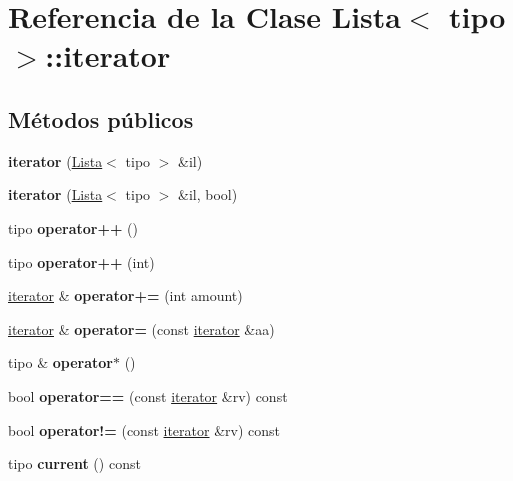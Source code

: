 \hypertarget{classLista_1_1iterator}{}\section{Referencia de la Clase Lista$<$ tipo $>$\+:\+:iterator}
\label{classLista_1_1iterator}
\subsection*{Métodos públicos}
\begin{DoxyCompactItemize}
\item 
\mbox{\label{classLista_1_1iterator_a1535d6055cf70a60518be63c0f62cc1d}} 
{\bfseries iterator} (\hyperlink{classLista}{Lista}$<$ tipo $>$ \&il)
\item 
\mbox{\label{classLista_1_1iterator_ad96ff61e26fb131406d0b320b36e9516}} 
{\bfseries iterator} (\hyperlink{classLista}{Lista}$<$ tipo $>$ \&il, bool)
\item 
\mbox{\label{classLista_1_1iterator_af8c7d385ce8bc7c62b8bc806db714ae9}} 
tipo {\bfseries operator++} ()
\item 
\mbox{\label{classLista_1_1iterator_ac9059ed8e1f396ec967ae97b571d11fe}} 
tipo {\bfseries operator++} (int)
\item 
\mbox{\label{classLista_1_1iterator_a99315852e99d13cfac11f570917ac092}} 
\hyperlink{classLista_1_1iterator}{iterator} \& {\bfseries operator+=} (int amount)
\item 
\mbox{\label{classLista_1_1iterator_a602f51e54500d6027158a48a8495826a}} 
\hyperlink{classLista_1_1iterator}{iterator} \& {\bfseries operator=} (const \hyperlink{classLista_1_1iterator}{iterator} \&aa)
\item 
\mbox{\label{classLista_1_1iterator_a2a48c3991820aef39d777df2c8e19664}} 
tipo \& {\bfseries operator$\ast$} ()
\item 
\mbox{\label{classLista_1_1iterator_abb50011145596234ea6ac6d1bd5fe920}} 
bool {\bfseries operator==} (const \hyperlink{classLista_1_1iterator}{iterator} \&rv) const
\item 
\mbox{\label{classLista_1_1iterator_a25cd74ab23dd46dd3e9f0769c0264eb9}} 
bool {\bfseries operator!=} (const \hyperlink{classLista_1_1iterator}{iterator} \&rv) const
\item 
\mbox{\label{classLista_1_1iterator_a6e73de7c83716c9bd99bd68b89214d81}} 
tipo {\bfseries current} () const
\end{DoxyCompactItemize}
